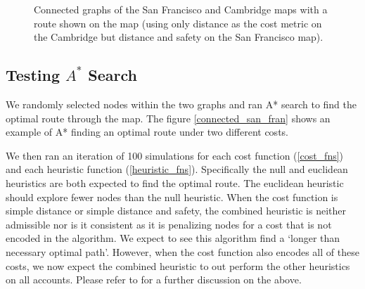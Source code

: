 \documentclass[11pt]{article}
\begin{document}
\begin{figure}%
    \centering
    \qquad
    \caption{Connected graphs of the San Francisco and Cambridge maps with a route shown on the map (using only distance as the cost metric on the Cambridge but distance and safety on the San Francisco map).}
    \label{connected_graphs}%
\end{figure}

\subsection{Testing $A^{*}$ Search}
We randomly selected nodes within the two graphs and ran A* search to find the optimal route through the map. The figure \ref{connected_san_fran} shows an example of A* finding an optimal route under two different costs.
\par
We then ran an iteration of 100 simulations for each cost function (\ref{cost_fns}) and each heuristic function (\ref{heuristic_fns}). Specifically the null and euclidean heuristics are both expected to find the optimal route. The euclidean heuristic should explore fewer nodes than the null heuristic. When the cost function is simple distance or simple distance and safety, the combined heuristic is neither admissible nor is it consistent as it is penalizing nodes for a cost that is not encoded in the algorithm. We expect to see this algorithm find a `longer than necessary optimal path'. However, when the cost function also encodes all of these costs, we now expect the combined heuristic to out perform the other heuristics on all accounts. Please refer to  for a further discussion on the above.
\end{document}

